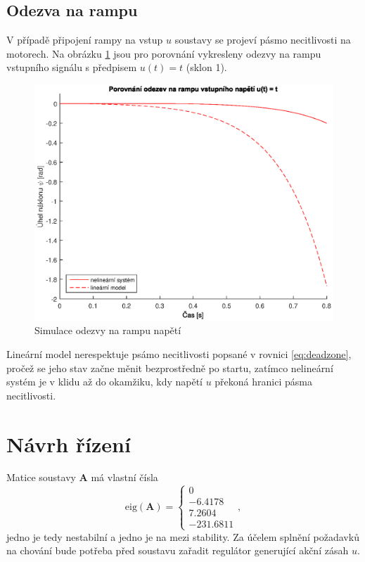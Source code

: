 \documentclass[conference]{IEEEtran}
\begin{document}
\subsection{Odezva na rampu}
V případě připojení rampy na vstup $u$ soustavy se projeví pásmo necitlivosti na motorech. Na obrázku \ref{fig:porovnani_rampa} jsou pro porovnání
vykresleny odezvy na rampu vstupního signálu s předpisem $u(t) = t$ (sklon 1). 
\begin{figure}[htbp]
    \centerline{\includegraphics[width=\linewidth]{porovnani_rampa.eps}}
    \caption{Simulace odezvy na rampu napětí}
    \label{fig:porovnani_rampa}        
\end{figure}
Lineární model nerespektuje psámo necitlivosti popsané v rovnici \eqref{eq:deadzone}, pročež se jeho stav začne měnit bezprostředně po startu,
zatímco nelineární systém je v klidu až do okamžiku, kdy napětí $u$ překoná hranici pásma necitlivosti.

\section{Návrh řízení}
Matice soustavy $\textbf{A}$ má vlastní čísla 
\begin{equation}
	\text{eig}(\mathbf{A}) =
	\begin{cases}
        0 \\
        -6.4178 \\
        7.2604 \\
        -231.6811
    \end{cases},
    \label{eq:unstable_poles}
\end{equation}
jedno je tedy nestabilní a jedno je na mezi stability. Za účelem splnění požadavků na chování bude potřeba před soustavu zařadit regulátor generující
akční zásah $u$.
\end{document}
